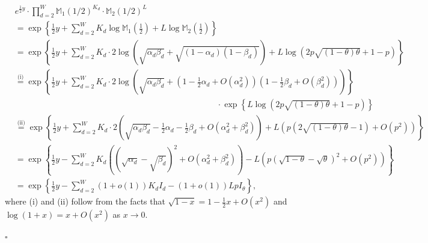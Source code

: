 \documentclass{article}
\newcommand\af{\alpha_d}
\newcommand\bt{\beta_d}
\begin{document}
        \begin{equation} \label{eqn11}
            \begin{aligned}
                &   e^{\frac{1}{2}y} \cdot \prod_{d=2}^{W} \mathbb{M}_{1} \left(1/2\right)^{K_d} \cdot \mathbb{M}_{2} \left(1/2 \right)^{L}  \\
			& = \exp \left\{\frac{1}{2}y+ \sum_{d=2}^{W} K_d \log  \mathbb{M}_{1}\left(\frac{1}{2} \right) + L \log \mathbb{M}_{2} \left(\frac{1}{2} \right)  \right\} \\
			& = \exp \left\{ \frac{1}{2}y + \sum_{d=2}^{W} K_d  \cdot 2\log \left(\sqrt{\af \bt } + \sqrt{(1-\af) (1-\bt)} \right) + L \log \left( 2p\sqrt{(1-\theta)\theta}+1-p \right)  \right\} \\
			& \overset{\text{(i)}}{=} \exp\left\{\frac{1}{2}y + \sum_{d=2}^{W} K_d \cdot 2\log \left(\sqrt{ \af \bt } + \left( 1- \frac{1}{2} \af +O(\af^2) \right)\left( 1- \frac{1}{2}\bt + O(\bt^2) \right)\right) \right\} \\
            & \qquad\qquad\qquad\qquad\qquad\qquad\qquad\qquad\qquad\qquad\qquad\qquad \cdot \exp \left\{ L \log \left( 2p\sqrt{(1-\theta)\theta}+1-p \right) \right\} \\
			& \overset{\text{(ii)}}{=} \exp \left\{\frac{1}{2}y + \sum_{d=2}^{W} K_d \cdot 2 \left( \sqrt{\af \bt}-\frac{1}{2}\af-\frac{1}{2}\bt +O(\af^2 + \bt^2) \right) +L \left( p(2\sqrt{(1-\theta)\theta}-1)+O(p^2)\right)  \right\} \\
			& =\exp \left\{ \frac{1}{2}y - \sum_{d=2}^{W} K_d \left((\sqrt{\af}-\sqrt{\bt})^2 + O(\af^2 + \bt^2)\right) - L \left(p(\sqrt{1-\theta}-\sqrt{\theta})^2+O(p^2)\right) \right\} \\
			& =\exp\left\{ \frac{1}{2}y - \sum_{d=2}^{W}(1+o(1))K_d I_d - (1+o(1)) L p I_\theta \right\},
            \end{aligned}
        \end{equation}
	where (i) and (ii) follow from the facts that $\sqrt{1-x}=1-\frac{1}{2}x+O(x^2)$ and $\log(1+x)=x+O(x^2)$ as $x\rightarrow 0$. 
    
 \hfill $\square$\par
\end{document}
